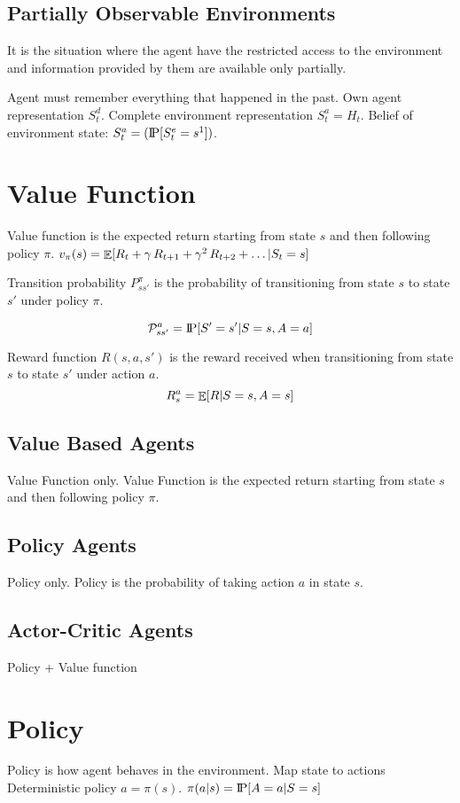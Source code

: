 \begin{itemize}
\subsection{Partially Observable Environments}
It is the situation where the agent have the restricted access to the environment
and information provided by them are available only partially.

Agent must remember everything that happened in the past.
Own agent representation $S_t^d$.
Complete environment representation $S_t^a=H_t$.
Belief of environment state: $S_t^a=(\text{I\kern-0.15em P}[S_t^e=s^1])$.


\section{Value Function}
Value function is the expected return starting from state $s$ and then following policy $\pi$.
$v_{\pi}(s)=\mathop{\mathbb{E}}[R_t+\gamma\,R_{t+1}+\gamma^2\,R_{t+2}+\ldots|S_t=s]$

Transition probability $P_{ss'}^{\pi}$ is the probability of transitioning from state $s$ to state $s'$ under policy $\pi$.

\[
    \mathcal{P}_{ss'}^a=\text{I\kern-0.15em P}[S'=s'|S=s,A=a]
\]

Reward function $R(s,a,s')$ is the reward received when transitioning from state $s$ to state $s'$ under action $a$.
\[
    R_s^a=\mathop{\mathbb{E}}[R|S=s,A=s]
\]

\subsection{Value Based Agents}\label{subsec:value-based-agents}
Value Function only.
Value Function is the expected return starting from state $s$ and then following policy $\pi$.

\subsection{Policy Agents}\label{subsec:policy-agents}
Policy only.
Policy is the probability of taking action $a$ in state $s$.

\subsection{Actor-Critic Agents}\label{subsec:actor-critic-agents}
Policy + Value function


\section{Policy}
Policy is how agent behaves in the environment.
Map state to actions
Deterministic policy $a=\pi(s)$.
$\pi(a|s)=\text{I\kern-0.15em P}[A=a|S=s]$


\end{itemize}
